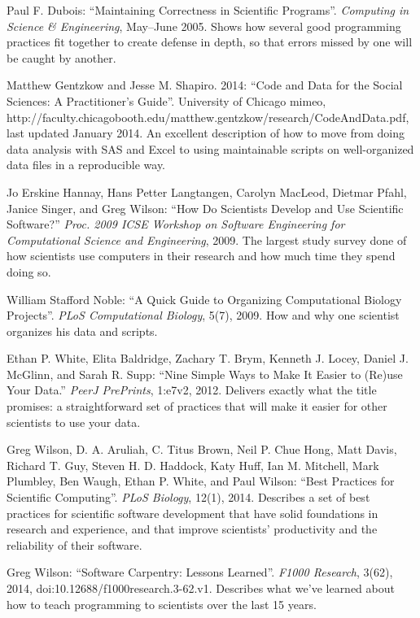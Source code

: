 \documentclass{book}
\begin{document}
\begin{swcdescription}

\item[Paul F. Dubois: ``Maintaining Correctness in Scientific
Programs''. \emph{Computing in Science \& Engineering}, May--June 2005.]
Shows how several good programming practices fit together to create
defense in depth, so that errors missed by one will be caught by
another.

\item[Matthew Gentzkow and Jesse M. Shapiro. 2014: ``Code and Data for
the Social Sciences: A Practitioner's Guide''. University of Chicago
mimeo,
http://faculty.chicagobooth.edu/matthew.gentzkow/research/CodeAndData.pdf,
last updated January 2014.]
An excellent description of how to move from doing data analysis with
SAS and Excel to using maintainable scripts on well-organized data files
in a reproducible way.

\item[Jo Erskine Hannay, Hans Petter Langtangen, Carolyn MacLeod,
Dietmar Pfahl, Janice Singer, and Greg Wilson: ``How Do Scientists
Develop and Use Scientific Software?'' \emph{Proc. 2009 ICSE Workshop on
Software Engineering for Computational Science and Engineering}, 2009.]
The largest study survey done of how scientists use computers in their
research and how much time they spend doing so.

\item[William Stafford Noble: ``A Quick Guide to Organizing
Computational Biology Projects''. \emph{PLoS Computational Biology},
5(7), 2009.]
How and why one scientist organizes his data and scripts.

\item[Ethan P. White, Elita Baldridge, Zachary T. Brym, Kenneth J.
Locey, Daniel J. McGlinn, and Sarah R. Supp: ``Nine Simple Ways to Make
It Easier to (Re)use Your Data.'' \emph{PeerJ PrePrints}, 1:e7v2, 2012.]
Delivers exactly what the title promises: a straightforward set of
practices that will make it easier for other scientists to use your
data.

\item[Greg Wilson, D. A. Aruliah, C. Titus Brown, Neil P. Chue Hong,
Matt Davis, Richard T. Guy, Steven H. D. Haddock, Katy Huff, Ian M.
Mitchell, Mark Plumbley, Ben Waugh, Ethan P. White, and Paul Wilson:
``Best Practices for Scientific Computing''. \emph{PLoS Biology}, 12(1),
2014.]
Describes a set of best practices for scientific software development
that have solid foundations in research and experience, and that improve
scientists' productivity and the reliability of their software.

\item[Greg Wilson: ``Software Carpentry: Lessons Learned''. \emph{F1000
Research}, 3(62), 2014,
doi:10.12688/f1000research.3-62.v1.]
Describes what we've learned about how to teach programming to
scientists over the last 15 years.

\end{swcdescription}
\end{document}
